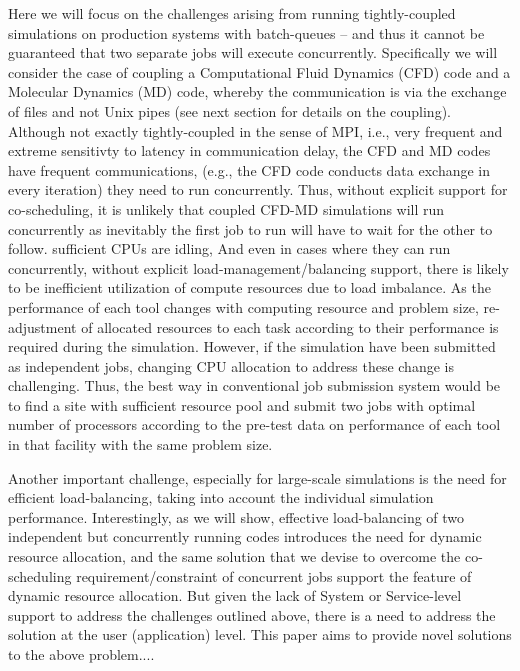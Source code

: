 \documentclass[conference,final]{IEEEtran}
\begin{document}
Here we will focus on the challenges arising from running tightly-coupled simulations on 
production systems with batch-queues -- and thus it cannot be guaranteed that two 
separate jobs will execute concurrently. Specifically we will consider the case of 
coupling a Computational Fluid Dynamics (CFD) code and a Molecular Dynamics (MD) code, 
whereby the communication is via the exchange of files and not Unix pipes (see next 
section for details on the coupling). Although not exactly tightly-coupled in the sense 
of MPI, i.e., very frequent and extreme sensitivty to latency in communication delay, the 
CFD and MD codes have frequent communications, (e.g., the CFD code conducts data exchange 
in every iteration) they need to run concurrently. Thus, without explicit support for 
co-scheduling, it is unlikely that coupled CFD-MD simulations will run concurrently as 
inevitably the first job to run will have to wait for the other to follow.
sufficient CPUs are idling,
And even in cases where they can run concurrently, without explicit 
load-management/balancing support, there is likely to be inefficient utilization of 
compute resources due to load imbalance. As the performance of each tool changes with 
computing resource and problem size, re-adjustment of allocated resources to each task 
according to their performance is required during the simulation. However, if the 
simulation have been submitted as independent jobs, changing CPU allocation to address 
these change is challenging. Thus, the best way in conventional job submission system 
would be to find a site with sufficient resource pool and submit two jobs with optimal 
number of processors according to the pre-test data on performance of each tool in that 
facility with the same problem size.

Another important challenge, especially for large-scale simulations is the need for 
efficient load-balancing, taking into account the individual simulation performance. 
Interestingly, as we will show, effective load-balancing of two independent but 
concurrently running codes introduces the need for dynamic resource allocation, and the 
same solution that we devise to overcome the co-scheduling requirement/constraint of 
concurrent jobs support the feature of dynamic resource allocation. But given the lack 
of System or Service-level support to address the challenges outlined above, there is a 
need to address the solution at the user (application) level. This paper aims to provide 
novel solutions to the above problem....
\end{document}

